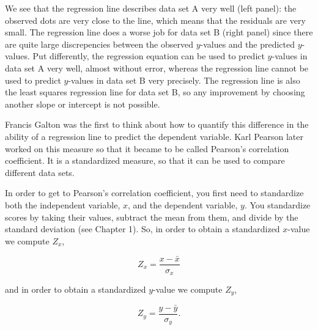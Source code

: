 \documentclass[]{book}\usepackage[]{graphicx}\usepackage[]{color}
\begin{document}
We see that the regression line describes data set A very well (left panel): the observed dots are very close to the line, which means that the residuals are very small. The regression line does a worse job for data set B (right panel) since there are quite large discrepencies between the observed $y$-values and the predicted $y$-values. Put differently, the regression equation can be used to predict $y$-values in data set A very well, almost without error, whereas the regression line cannot be used to predict $y$-values in data set B very precisely. The regression line is also the least squares regression line for data set B, so any improvement by choosing another slope or intercept is not possible.

Francis Galton was the first to think about how to quantify this difference in the ability of a regression line to predict the dependent variable. Karl Pearson later worked on this measure so that it became to be called Pearson's correlation coefficient. It is a standardized measure, so that it can be used to compare different data sets.

In order to get to Pearson's correlation coefficient, you first need to standardize both the independent variable, $x$, and the dependent variable, $y$. You standardize scores by taking their values, subtract the mean from them, and divide by the standard deviation (see Chapter 1). So, in order to obtain a standardized $x$-value we compute $Z_x$,

\begin{equation}
Z_x = \frac{x- \bar{x}}{\sigma_x}
\end{equation}

and in order to obtain a standardized $y$-value we compute $Z_y$,

\begin{equation}
Z_y = \frac{y- \bar{y}}{\sigma_y}.
\end{equation}
\end{document}
